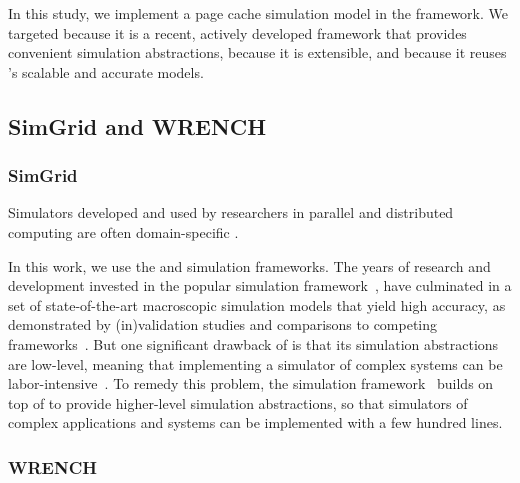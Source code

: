 In this study, we implement a page cache simulation model in the
\wrench framework. We targeted \wrench because it is a recent,
actively developed framework that provides convenient simulation
abstractions, because it is extensible, and because it reuses
\simgrid's scalable and accurate models.

\subsection{SimGrid and WRENCH}

\subsubsection{SimGrid}
Simulators developed and used by researchers in parallel and distributed 
computing are often domain-specific \cite{casanova2014simgrid}.

In this work, we use the \simgrid and \wrench simulation
frameworks.  The years of research and development invested in
the popular \simgrid simulation framework~\cite{casanova2014simgrid}, have
culminated in a set of state-of-the-art macroscopic simulation
models that yield high accuracy, as demonstrated by
(in)validation studies and comparisons to competing
frameworks~\cite{smpi_validity, velhoTOMACS2013, simutool_09,
nstools_07, lebre2015, pouilloux:hal-01197274,
smpi_tpds2017,  7885814, 8048921, 7384330}.  But one
significant drawback of \simgrid is that its simulation
abstractions are low-level, meaning that implementing a
simulator of complex systems can be
labor-intensive~\cite{kecskemeti_2014}. To remedy this problem,
the \wrench simulation framework~\cite{casanova2020fgcs}
builds on top of \simgrid to provide higher-level simulation
abstractions, so that simulators of complex applications and
systems can be implemented with a few hundred lines.

\subsubsection{WRENCH}